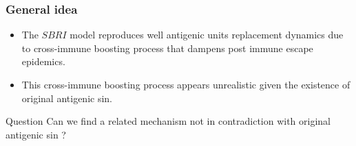 \documentclass{beamer}
\begin{document}
\begin{frame}
  \frametitle{General idea}
  \begin{itemize}
  \item The $SBRI$ model reproduces well antigenic units replacement
    dynamics due to cross-immune boosting process that dampens post
    immune escape epidemics.
  \item This cross-immune boosting process appears unrealistic given
    the existence of original antigenic sin.
  \end{itemize}

  \begin{block}{Question}
    Can we find a related mechanism not in contradiction with original
    antigenic sin ?
  \end{block}

\end{frame}
\end{document}
